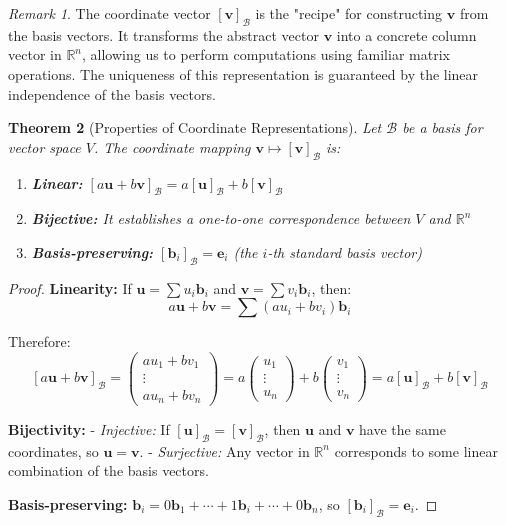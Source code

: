 \documentclass[12pt]{article}
\numberwithin{equation}{section}
\newcommand{\vect}[1]{\boldsymbol{#1}}   %
\theoremstyle{plain}
\newtheorem{theorem}{Theorem}[section]
\theoremstyle{definition}
\theoremstyle{remark}
\newtheorem{remark}[theorem]{Remark}
\begin{document}
\begin{remark}
The coordinate vector $[\vect{v}]_{\mathcal{B}}$ is the "recipe" for constructing $\vect{v}$ from the basis vectors. It transforms the abstract vector $\vect{v}$ into a concrete column vector in $\mathbb{R}^n$, allowing us to perform computations using familiar matrix operations. The uniqueness of this representation is guaranteed by the linear independence of the basis vectors.
\end{remark}

\begin{theorem}[Properties of Coordinate Representations]
Let $\mathcal{B}$ be a basis for vector space $V$. The coordinate mapping $\vect{v} \mapsto [\vect{v}]_{\mathcal{B}}$ is:
\begin{enumerate}
\item \textbf{Linear:} $[a\vect{u} + b\vect{v}]_{\mathcal{B}} = a[\vect{u}]_{\mathcal{B}} + b[\vect{v}]_{\mathcal{B}}$
\item \textbf{Bijective:} It establishes a one-to-one correspondence between $V$ and $\mathbb{R}^n$
\item \textbf{Basis-preserving:} $[\vect{b}_i]_{\mathcal{B}} = \vect{e}_i$ (the $i$-th standard basis vector)
\end{enumerate}
\end{theorem}

\begin{proof}
\textbf{Linearity:} If $\vect{u} = \sum u_i\vect{b}_i$ and $\vect{v} = \sum v_i\vect{b}_i$, then:
$$a\vect{u} + b\vect{v} = \sum (au_i + bv_i)\vect{b}_i$$

Therefore:
$$[a\vect{u} + b\vect{v}]_{\mathcal{B}} = \begin{pmatrix} au_1 + bv_1 \\ \vdots \\ au_n + bv_n \end{pmatrix} = a\begin{pmatrix} u_1 \\ \vdots \\ u_n \end{pmatrix} + b\begin{pmatrix} v_1 \\ \vdots \\ v_n \end{pmatrix} = a[\vect{u}]_{\mathcal{B}} + b[\vect{v}]_{\mathcal{B}}$$

\textbf{Bijectivity:} 
- \textit{Injective:} If $[\vect{u}]_{\mathcal{B}} = [\vect{v}]_{\mathcal{B}}$, then $\vect{u}$ and $\vect{v}$ have the same coordinates, so $\vect{u} = \vect{v}$.
- \textit{Surjective:} Any vector in $\mathbb{R}^n$ corresponds to some linear combination of the basis vectors.

\textbf{Basis-preserving:} $\vect{b}_i = 0\vect{b}_1 + \cdots + 1\vect{b}_i + \cdots + 0\vect{b}_n$, so $[\vect{b}_i]_{\mathcal{B}} = \vect{e}_i$.
\end{proof}
\end{document}
